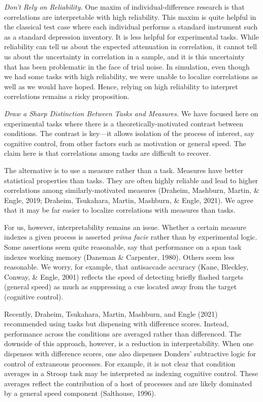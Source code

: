 \documentclass[
  english,
  ,man]{apa6}
\begin{document}
\emph{Don't Rely on Reliability.} One maxim of individual-difference research is that correlations are interpretable with high reliability. This maxim is quite helpful in the classical test case where each individual performs a standard instrument such as a standard depression inventory. It is less helpful for experimental tasks. While reliability can tell us about the expected attenuation in correlation, it cannot tell us about the uncertainty in correlation in a sample, and it is this uncertainty that has been problematic in the face of trial noise. In simulation, even though we had some tasks with high reliability, we were unable to localize correlations as well as we would have hoped. Hence, relying on high reliability to interpret correlations remains a risky proposition.

\emph{Draw a Sharp Distinction Between Tasks and Measures.} We have focused here on experimental tasks where there is a theoretically-motivated contrast between conditions. The contrast is key---it allows isolation of the process of interest, say cognitive control, from other factors such as motivation or general speed. The claim here is that correlations among tasks are difficult to recover.

The alternative is to use a measure rather than a task. Measures have better statistical properties than tasks. They are often highly reliable and lead to higher correlations among similarly-motivated measures (Draheim, Mashburn, Martin, \& Engle, 2019; Draheim, Tsukahara, Martin, Mashburn, \& Engle, 2021). We agree that it may be far easier to localize correlations with measures than tasks.

For us, however, interpretability remains an issue. Whether a certain measure indexes a given process is asserted \emph{prima facie} rather than by experimental logic. Some assertions seem quite reasonable, say that performance on a span task indexes working memory (Daneman \& Carpenter, 1980). Others seem less reasonable. We worry, for example, that antisaccade accuracy (Kane, Bleckley, Conway, \& Engle, 2001) reflects the speed of detecting briefly flashed targets (general speed) as much as suppressing a cue located away from the target (cognitive control).

Recently, Draheim, Tsukahara, Martin, Mashburn, and Engle (2021) recommended using tasks but dispensing with difference scores. Instead, performance across the conditions are averaged rather than differenced. The downside of this approach, however, is a reduction in interpretability. When one dispenses with difference scores, one also dispenses Donders' subtractive logic for control of extraneous processes. For example, it is not clear that condition averages in a Stroop task may be interpreted as indexing cognitive control. These averages reflect the contribution of a host of processes and are likely dominated by a general speed component (Salthouse, 1996).
\end{document}

